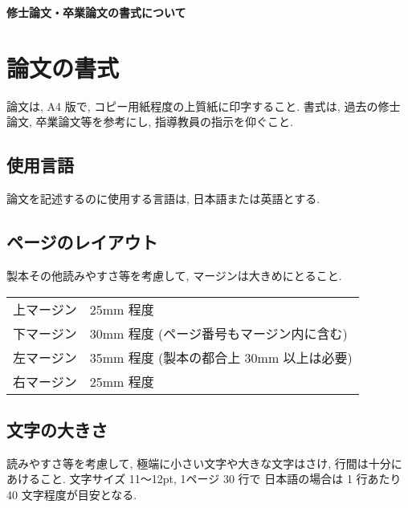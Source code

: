 \documentclass[11pt]{jarticle}
\begin{document}
\pagestyle{empty}
\begin{center}
{\Large\bf
修士論文・卒業論文の書式について}
\end{center}
%
\section{論文の書式}
\noindent
論文は, A4 版で, コピー用紙程度の上質紙に印字すること. 
書式は, 過去の修士論文, 卒業論文等を参考にし, 指導教員の指示を仰ぐこと. 
%
\subsection{使用言語}
\noindent
論文を記述するのに使用する言語は, 日本語または英語とする. 
%
\subsection{ページのレイアウト}
\noindent
製本その他読みやすさ等を考慮して, マージンは大きめにとること.

\vspace*{3mm}
\hspace*{10mm}
\begin{tabular}{ll}
上マージン & 25mm 程度 \\
下マージン & 30mm 程度 (ページ番号もマージン内に含む) \\
左マージン & 35mm 程度 (製本の都合上 30mm 以上は必要) \\
右マージン & 25mm 程度 \\
\end{tabular}

\subsection{文字の大きさ}
\noindent
読みやすさ等を考慮して, 極端に小さい文字や大きな文字はさけ, 
行間は十分にあけること. 
文字サイズ 11〜12pt, 1ページ 30 行で
日本語の場合は 1 行あたり 40 文字程度が目安となる. 
\end{document}
